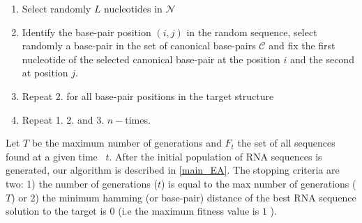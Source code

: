 \begin{enumerate}
	\item Select randomly $L$ nucleotides in $\mathcal{N}$
	
	\item Identify the base-pair position $(i,j)$ in the random sequence, select randomly a base-pair in the set of canonical base-pairs $\mathcal{C}$ and fix the first nucleotide of the selected canonical base-pair at the position $i$ and the second at position $j$.
	
	\item  Repeat 2. for all base-pair positions in the target structure
	
	\item Repeat 1. 2. and 3. $n-$times.
\end{enumerate}
Let \(T\) be the maximum number of generations and \(F_t\) the set of all sequences found at a given time ~\(t\). After the initial population of \ac{RNA} sequences is generated, our algorithm is described in \autoref{main_EA}. The stopping criteria are two: 1) the number of generations ($t$) is equal to the max number of generations ($T$) or 2) the minimum hamming (or base-pair) distance of the best \ac{RNA} sequence solution to the target is $0$ (i.e the maximum fitness value is $1$ ).
\vspace{0.05cm}

